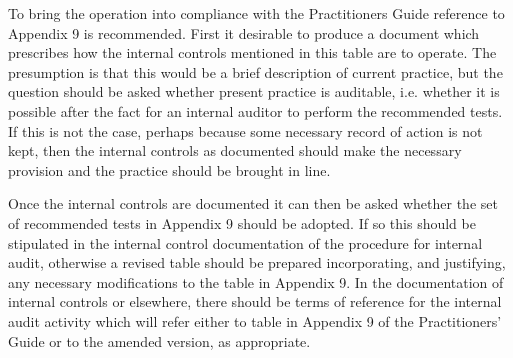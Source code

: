 \documentclass[numreferences]{rbjk}
\begin{document}
\begin{article}
To bring the operation into compliance with the Practitioners Guide reference to Appendix 9 is recommended.
First it desirable to produce a document which prescribes how the internal controls mentioned in this table are to operate.
The presumption is that this would be a brief description of current practice, but the question should be asked whether present practice is auditable, i.e. whether it is possible after the fact for an internal auditor to perform the recommended tests.
If this is not the case, perhaps because some necessary record of action is not kept, then the internal controls as documented should make the necessary provision and the practice should be brought in line.

Once the internal controls are documented it can then be asked whether the set of recommended tests in Appendix 9 should be adopted.
If so this should be stipulated in the internal control documentation of the procedure for internal audit, otherwise a revised table should be prepared incorporating, and justifying, any necessary modifications to the table in Appendix 9. 
In the documentation of internal controls or elsewhere, there should be terms of reference for the internal audit activity which will refer either to table in Appendix 9 of the Practitioners' Guide or to the amended version, as appropriate.

{\raggedright


} %


\end{article}
\end{document}
